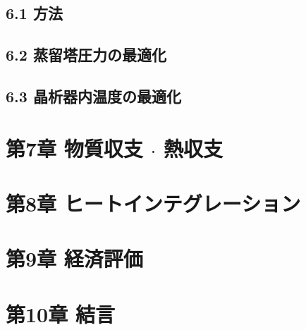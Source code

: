 \documentclass[platex, a4j]{jsarticle}
\begin{document}
\section*{6.1 方法}
\section*{6.2 蒸留塔圧力の最適化}
\section*{6.3 晶析器内温度の最適化}

\chapter*{第7章 物質収支 $\cdot$ 熱収支}

\chapter*{第8章 ヒートインテグレーション}

\chapter*{第9章 経済評価}

\chapter*{第10章 結言}
\end{document}
